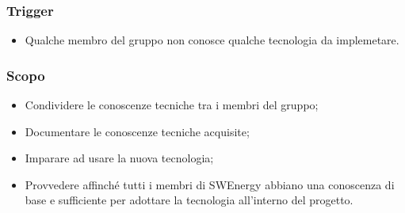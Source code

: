 \subsubsection*{Trigger}
\begin{itemize}
	\item Qualche membro del gruppo non conosce qualche tecnologia da
		implemetare.
\end{itemize}

\subsubsection*{Scopo}
\begin{itemize}
	\item Condividere le conoscenze tecniche tra i membri del gruppo;

	\item Documentare le conoscenze tecniche acquisite;

	\item Imparare ad usare la nuova tecnologia;

	\item Provvedere affinché tutti i membri di SWEnergy abbiano una conoscenza
		di base e sufficiente per adottare la tecnologia all'interno del
		progetto.
\end{itemize}

